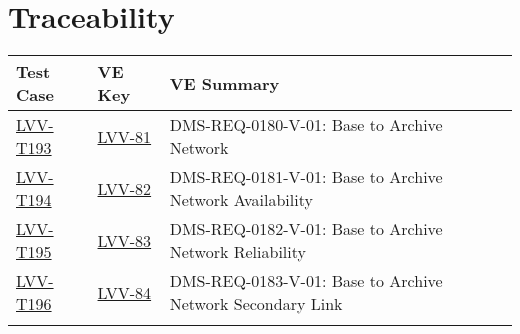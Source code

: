 \section{Traceability}

\begin{longtable}{p{3cm}p{3cm}L{9cm}}
\hline
\textbf{Test Case} & \textbf{VE Key} & \textbf{VE Summary} \\ \hline
\href{https://jira.lsstcorp.org/secure/Tests.jspa#/testCase/LVV-T193}{LVV-T193} &
  \href{https://jira.lsstcorp.org/browse/LVV-81}{LVV-81}
  & DMS-REQ-0180-V-01: Base to Archive Network
 \\ 
\hline
\href{https://jira.lsstcorp.org/secure/Tests.jspa#/testCase/LVV-T194}{LVV-T194} &
  \href{https://jira.lsstcorp.org/browse/LVV-82}{LVV-82}
  & DMS-REQ-0181-V-01: Base to Archive Network Availability
 \\ 
\hline
\href{https://jira.lsstcorp.org/secure/Tests.jspa#/testCase/LVV-T195}{LVV-T195} &
  \href{https://jira.lsstcorp.org/browse/LVV-83}{LVV-83}
  & DMS-REQ-0182-V-01: Base to Archive Network Reliability
 \\ 
\hline
\href{https://jira.lsstcorp.org/secure/Tests.jspa#/testCase/LVV-T196}{LVV-T196} &
  \href{https://jira.lsstcorp.org/browse/LVV-84}{LVV-84}
  & DMS-REQ-0183-V-01: Base to Archive Network Secondary Link
 \\ 
\hline
\end{longtable}
